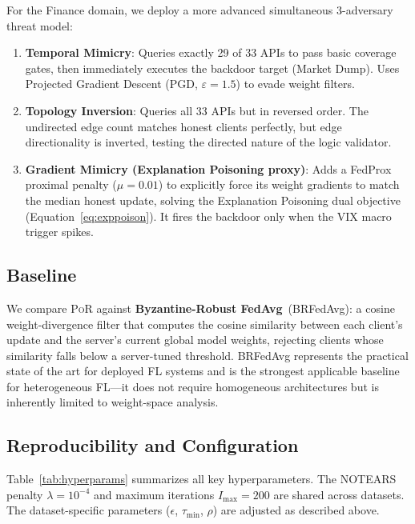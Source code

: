 \documentclass[journal]{IEEEtran}
\newcommand{\por}{\textsc{PoR}}
\newcommand{\notears}{\textsc{NOTEARS}}
\begin{document}
For the Finance domain, we deploy a more advanced simultaneous
3-adversary threat model:
\begin{enumerate}
    \item \textbf{Temporal Mimicry}: Queries exactly 29 of 33 APIs to pass basic
          coverage gates, then immediately executes the backdoor target (Market Dump).
          Uses Projected Gradient Descent (PGD, $\varepsilon=1.5$) to evade
          weight filters.
    \item \textbf{Topology Inversion}: Queries all 33 APIs but in reversed order.
          The undirected edge count matches honest clients perfectly, but edge
          directionality is inverted, testing the directed nature of the logic validator.
    \item \textbf{Gradient Mimicry (Explanation Poisoning proxy)}: Adds a FedProx
          proximal penalty ($\mu=0.01$) to explicitly force its weight gradients to
          match the median honest update, solving the Explanation Poisoning dual
          objective (Equation~\ref{eq:exppoison}). It fires the backdoor only
          when the VIX macro trigger spikes.
\end{enumerate}

\subsection{Baseline}

We compare \por{} against \textbf{Byzantine-Robust FedAvg}~(BRFedAvg):
a cosine weight-divergence filter that computes the cosine similarity between
each client's update and the server's current global model weights, rejecting
clients whose similarity falls below a server-tuned threshold. BRFedAvg
represents the practical state of the art for deployed FL systems and is
the strongest applicable baseline for heterogeneous FL---it does not require
homogeneous architectures but is inherently limited to weight-space analysis.

\subsection{Reproducibility and Configuration}
\label{sec:repro}

Table~\ref{tab:hyperparams} summarizes all key hyperparameters. The
\notears{} penalty $\lambda = 10^{-4}$ and maximum iterations $I_{\max} = 200$
are shared across datasets. The dataset-specific parameters ($\epsilon$,
$\tau_{\min}$, $\rho$) are adjusted as described above.
\end{document}
